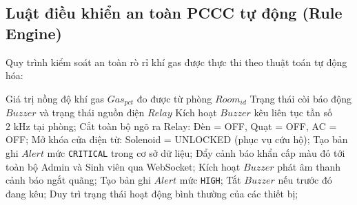 \subsection{Luật điều khiển an toàn PCCC tự động (Rule Engine)}
Quy trình kiểm soát an toàn rò rỉ khí gas được thực thi theo thuật toán tự động hóa:
\begin{algorithm}[H]
\caption{Quy trình phản ứng sự cố an toàn PCCC tự động}
\label{alg:fire_safety}
\begin{algorithmic}[1]
\REQUIRE Giá trị nồng độ khí gas $Gas_{pct}$ đo được từ phòng $Room_{id}$
\ENSURE Trạng thái còi báo động $Buzzer$ và trạng thái nguồn điện $Relay$
    \STATE Kích hoạt $Buzzer$ kêu liên tục tần số $2\text{ kHz}$ tại phòng;
    \STATE Cắt toàn bộ ngõ ra Relay: Đèn = OFF, Quạt = OFF, AC = OFF;
    \STATE Mở khóa cửa điện từ: Solenoid = UNLOCKED (phục vụ cứu hộ);
    \STATE Tạo bản ghi $Alert$ mức \texttt{CRITICAL} trong cơ sở dữ liệu;
    \STATE Đẩy cảnh báo khẩn cấp màu đỏ tới toàn bộ Admin và Sinh viên qua WebSocket;
    \STATE Kích hoạt $Buzzer$ phát âm thanh cảnh báo ngắt quãng;
    \STATE Tạo bản ghi $Alert$ mức \texttt{HIGH};
\ELSE
    \STATE Tắt $Buzzer$ nếu trước đó đang kêu;
    \STATE Duy trì trạng thái hoạt động bình thường của các thiết bị;
\ENDIF
\end{algorithmic}
\end{algorithm}

